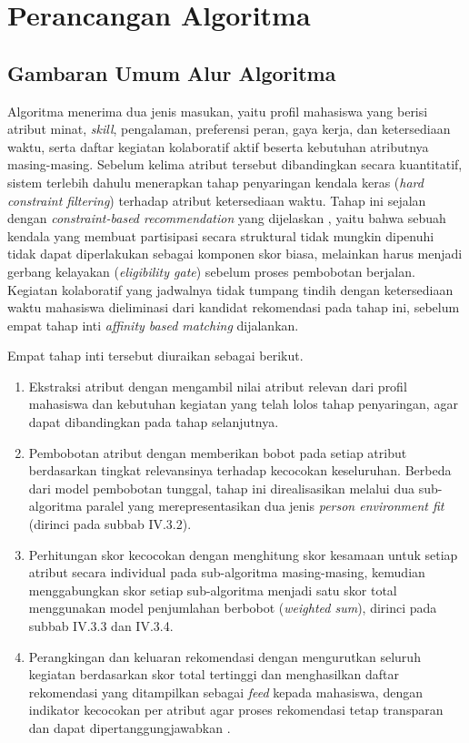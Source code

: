 \section{Perancangan Algoritma}

\subsection{Gambaran Umum Alur Algoritma}

Algoritma menerima dua jenis masukan, yaitu profil mahasiswa yang berisi atribut minat, \emph{skill}, pengalaman, preferensi peran, gaya kerja, dan ketersediaan waktu, serta daftar kegiatan kolaboratif aktif beserta kebutuhan atributnya masing-masing. Sebelum kelima atribut tersebut dibandingkan secara kuantitatif, sistem terlebih dahulu menerapkan tahap penyaringan kendala keras (\emph{hard constraint filtering}) terhadap atribut ketersediaan waktu. Tahap ini sejalan dengan \emph{constraint-based recommendation} yang dijelaskan \textcite{felfernig2014}, yaitu bahwa sebuah kendala yang membuat partisipasi secara struktural tidak mungkin dipenuhi tidak dapat diperlakukan sebagai komponen skor biasa, melainkan harus menjadi gerbang kelayakan (\emph{eligibility gate}) sebelum proses pembobotan berjalan. Kegiatan kolaboratif yang jadwalnya tidak tumpang tindih dengan ketersediaan waktu mahasiswa dieliminasi dari kandidat rekomendasi pada tahap ini, sebelum empat tahap inti \emph{affinity based matching} dijalankan.

Empat tahap inti tersebut diuraikan sebagai berikut.

\begin{enumerate}
  \item Ekstraksi atribut dengan mengambil nilai atribut relevan dari profil mahasiswa dan kebutuhan kegiatan yang telah lolos tahap penyaringan, agar dapat dibandingkan pada tahap selanjutnya.
  \item Pembobotan atribut dengan memberikan bobot pada setiap atribut berdasarkan tingkat relevansinya terhadap kecocokan keseluruhan. Berbeda dari model pembobotan tunggal, tahap ini direalisasikan melalui dua sub-algoritma paralel yang merepresentasikan dua jenis \emph{person environment fit} \autocite{langgeng2021} (dirinci pada subbab IV.3.2).
  \item Perhitungan skor kecocokan dengan menghitung skor kesamaan untuk setiap atribut secara individual pada sub-algoritma masing-masing, kemudian menggabungkan skor setiap sub-algoritma menjadi satu skor total menggunakan model penjumlahan berbobot (\emph{weighted sum}), dirinci pada subbab IV.3.3 dan IV.3.4.
  \item Perangkingan dan keluaran rekomendasi dengan mengurutkan seluruh kegiatan berdasarkan skor total tertinggi dan menghasilkan daftar rekomendasi yang ditampilkan sebagai \emph{feed} kepada mahasiswa, dengan indikator kecocokan per atribut agar proses rekomendasi tetap transparan dan dapat dipertanggungjawabkan \autocite{tintarev2007}.
\end{enumerate}

